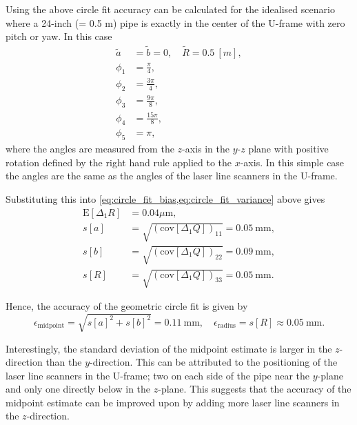 Using the above circle fit accuracy can be calculated for the idealised scenario where a 24-inch (= 0.5 m) pipe is exactly in the center of the U-frame with zero pitch or yaw. In this case
\begin{align*}
    \tilde{a} & = \tilde{b} = 0, \quad \tilde{R} = 0.5 \ [m], \\
    \phi_1    & = \frac{\pi}{4},                              \\
    \phi_2    & = \frac{3\pi}{4},                             \\
    \phi_3    & = \frac{9\pi}{8},                             \\
    \phi_4    & = \frac{15\pi}{8},                            \\
    \phi_5    & = \pi,
\end{align*}
where the angles are measured from the $z$-axis in the $y$-$z$ plane with positive rotation defined by the right hand rule applied to the $x$-axis. In this simple case the angles are the same as the angles of the laser line scanners in the U-frame.

Substituting this into \cref{eq:circle_fit_bias,eq:circle_fit_variance} above gives
\begin{align*}
    \text{E}[\Delta_1 R] & = 0.04 \mu \text{m},                                       \\
    s[a]                 & = \sqrt{(\text{cov}[\Delta_1 Q])_{11}} = 0.05 \ \text{mm}, \\
    s[b]                 & = \sqrt{(\text{cov}[\Delta_1 Q])_{22}} = 0.09 \ \text{mm}, \\
    s[R]                 & = \sqrt{(\text{cov}[\Delta_1 Q])_{33}} = 0.05 \ \text{mm}.
\end{align*}

Hence, the accuracy of the geometric circle fit is given by
\begin{equation}
    \epsilon_{\text{midpoint}} = \sqrt{s[a]^2 + s[b]^2 } = 0.11 \ \text{mm}, \quad \epsilon_{\text{radius}} = s[R] \approx 0.05 \ \text{mm}.
    \label{eq:circle_fit_accuracy}
\end{equation}

Interestingly, the standard deviation of the midpoint estimate is larger in the $z$-direction than the $y$-direction. This can be attributed to the positioning of the laser line scanners in the U-frame; two on each side of the pipe near the $y$-plane and only one directly below in the $z$-plane. This suggests that the accuracy of the midpoint estimate can be improved upon by adding more laser line scanners in the $z$-direction.

